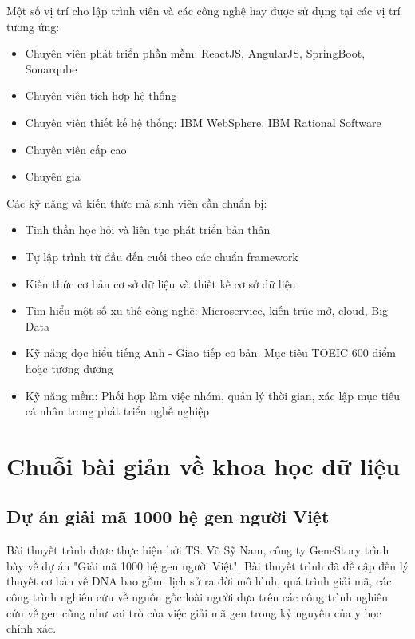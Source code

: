 \documentclass[14pt, a4paper]{article}
\numberwithin{equation}{section}
\numberwithin{figure}{section}
\numberwithin{dl}{section}
\numberwithin{md}{section}
\numberwithin{bd}{section}
\numberwithin{dn}{section}
\numberwithin{hq}{section}
\begin{document}
    Một số vị trí cho lập trình viên và các công nghệ hay được sử dụng tại các vị trí tương ứng:

    \begin{itemize}
        \item Chuyên viên phát triển phần mềm: ReactJS, AngularJS, SpringBoot, Sonarqube
        \item Chuyên viên tích hợp hệ thống
        \item Chuyên viên thiết kế hệ thống: IBM WebSphere, IBM Rational Software
        \item Chuyên viên cấp cao
        \item Chuyên gia
    \end{itemize}

    Các kỹ năng và kiến thức mà sinh viên cần chuẩn bị:

    \begin{itemize}
        \item Tinh thần học hỏi và liên tục phát triển bản thân
        \item Tự lập trình từ đầu đến cuối theo các chuẩn framework
        \item Kiến thức cơ bản cơ sở dữ liệu và thiết kế cơ sở dữ liệu
        \item Tìm hiểu một số xu thế công nghệ: Microservice, kiến trúc mở, cloud, Big Data
        \item Kỹ năng đọc hiểu tiếng Anh - Giao tiếp cơ bản. Mục tiêu TOEIC 600 điểm hoặc tương đương
        \item Kỹ năng mềm: Phối hợp làm việc nhóm, quản lý thời gian, xác lập mục tiêu cá nhân trong phát triển nghề nghiệp
    \end{itemize}

    \section{Chuỗi bài giản về khoa học dữ liệu}

    \subsection{Dự án giải mã 1000 hệ gen người Việt}

    Bài thuyết trình được thực hiện bởi TS. Võ Sỹ Nam, công ty GeneStory trình bày về dự án "Giải mã 1000 hệ gen người Việt".
    Bài thuyết trình đã đề cập đến lý thuyết cơ bản về DNA bao gồm: lịch sử ra đời mô hình, quá trình giải mã, các công trình nghiên cứu về nguồn gốc loài người dựa trên các công trình nghiên cứu về gen cũng như vai trò của việc giải mã gen trong kỷ nguyên của y học chính xác.
\end{document}
